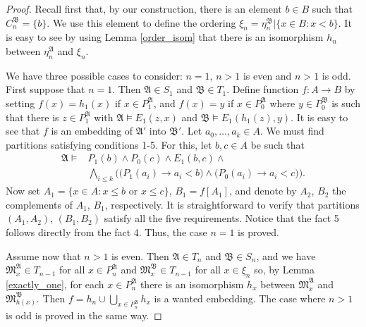 \documentclass{ndjflart}
\theoremstyle{plain}
\theoremstyle{definition}
\numberwithin{equation}{section}
\begin{document}
\begin{proof}
Recall first that, by our construction, there is an element $b \in B$ such that $C^{\mathfrak{B}}_n = \{b\}$.
We use this element to define the ordering $\xi_n = \eta^{\mathfrak{B}}_n | \{x \in B \colon x  < b \}$.
It is easy to see by using Lemma \ref{order_isom} that there is an isomorphism $h_n$ between $\eta^{\mathfrak{A}}_n$ and $\xi_n$.

We have three possible cases to consider: $n=1$, $n > 1$ is even and $n > 1$ is odd.
First suppose that $n = 1$. Then $\mathfrak{A} \in S_1$ and $\mathfrak{B} \in T_1$.
Define function $f \colon A \rightarrow B$ by setting $f(x) = h_1(x)$ if $x \in P_1^{\mathfrak{A}}$, and $f(x) = y$ if $x \in P^{\mathfrak{A}}_0$ where $y \in P^{\mathfrak{B}}_0$ is such that there is $z \in P^{\mathfrak{A}}_1$ with $\mathfrak{A} \vDash E_1(z,x)$ and $\mathfrak{B} \vDash E_1(h_1(z),y)$.
It is easy to see that $f$ is an embedding of $\mathfrak{A}'$ into $\mathfrak{B}'$.
Let $a_0,\dots,a_k \in A$. We must find partitions satisfying conditions 1-5.
For this, let $b, c \in A$ be such that 
\begin{align*}
	\mathfrak{A} \vDash &P_1(b) \wedge P_0(c) \wedge E_1(b,c) \wedge \\
	&\bigwedge_{i\leq k}\big(\big(P_1(a_i) \rightarrow a_i<b\big) \wedge \big(P_0(a_i)\rightarrow a_i < c\big)\big).
\end{align*}
Now set $A_1 = \{x \in A \colon x \leq b \text{ or } x \leq c \}$, $B_1 = f[A_1]$, and 
denote by $A_2$, $B_2$ the complements of $A_1$, $B_1$, respectively.
It is straightforward to verify that partitions $(A_1,A_2)$, $(B_1,B_2)$ satisfy all the five requirements. 
Notice that the fact 5 follows directly from the fact 4.
Thus, the case $n = 1$ is proved. 

Assume now that $n > 1$ is even. Then $\mathfrak{A} \in T_n$ and $\mathfrak{B} \in S_n$, and
we have $\mathfrak{M}^{\mathfrak{A}}_x \in T_{n-1}$ for all $x \in P^{\mathfrak{A}}_n$ and $\mathfrak{M}^{\mathfrak{B}}_x \in T_{n-1}$ for all $x \in \xi_n$ so, by Lemma \ref{exactly_one}, for each $x \in P_n^{\mathfrak{A}}$ there is an isomorphism $h_x$ between $\mathfrak{M}^{\mathfrak{A}}_x$ and $\mathfrak{M}^{\mathfrak{B}}_{h(x)}$.
Then $f = h_n \cup \bigcup_{x\in P^{\mathfrak{A}}_n}h_x$ is a wanted embedding.
The case where $n>1$ is odd is proved in the same way.
\end{proof}
\end{document}
